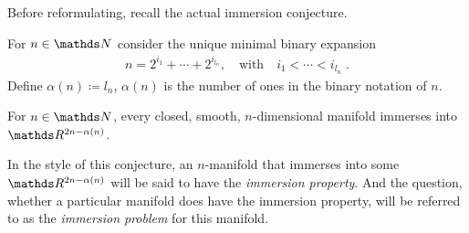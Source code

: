 Before reformulating, recall the actual immersion conjecture.
\begin{Def}
  For $n\in\Nat$ consider the unique minimal binary expansion
  \begin{gather*}
    n=2^{i_1}+\dotsb+2^{i_{l_n}},
    \quad\text{with}\quad
    i_1<\dotsb<i_{l_n}
    \;.
  \end{gather*}
  Define $\alpha(n)\coloneqq l_n$, \idest $\alpha(n)$ is the number of
  ones in the binary notation of $n$.
\end{Def}
\begin{Thm}\label{thm:immersionconj}
  For $n\in\Nat$, every closed, smooth, $n$-dimensional manifold
  immerses into $\R^{2n-\alpha(n)}$.
\end{Thm}
In the style of this conjecture, an $n$-manifold that immerses into
some $\R^{2n-\alpha(n)}$ will be said to have the
\emph{immersion property}. %
And the question, whether a particular manifold does have the
immersion property, will be referred to as the \emph{immersion problem} for
this manifold.

